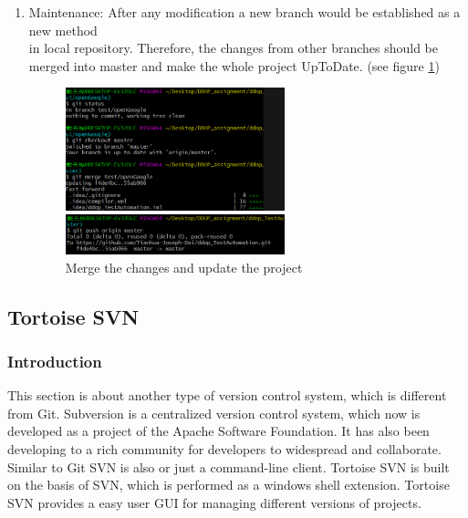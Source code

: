 \documentclass[12pt,a4paper,bibliography=totocnumbered,listof=totocnumbered]{article}
\begin{document}
\begin{enumerate}
\begin{minipage}{\linewidth}
		[Pic New Branch]{Update online}
		\label{fig:github04}
	\end{minipage}
	\item Maintenance: After any modification a new branch would be established as a new method\\
	in local repository. Therefore, the changes from other branches should be merged into master
	and make the whole project UpToDate. (see figure \ref{fig:github05})
	\begin{figure}[H] 
		\begin{minipage}[t]{0.5\linewidth} 
		\centering 
		\includegraphics[width=2.5in]{pics/gitMerge.png}  
		\end{minipage}%
		\begin{minipage}[t]{0.5\linewidth} 
		\centering 
		\includegraphics[width=2.5in]{pics/gitUpdate.png} 
		\end{minipage} %
		\caption{Merge the changes and update the project}
		\label{fig:github05}
	\end{figure}
\end{enumerate}

\subsection{Tortoise SVN}
\subsubsection{Introduction}
This section is about another type of version control system, which is different from Git.
Subversion is a centralized version control system, which now is developed as a project of the Apache Software Foundation. It has also been developing to a rich community for developers to widespread and collaborate.
\newline
Similar to Git SVN is also or just a command-line client. Tortoise SVN is built on the basis of SVN, which is performed as a windows shell extension. Tortoise SVN provides a easy user GUI for managing different versions of projects.
\end{document}
